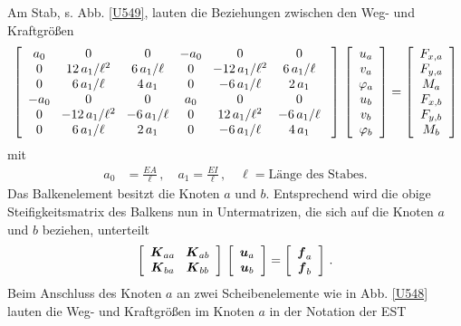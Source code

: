 Am Stab, s. Abb. \ref{U549}, lauten die Beziehungen zwischen den Weg- und Kraftgr\"{o}{\ss}en
\begin{align}
\left[\barr{c @{\hspace{3mm}} c @{\hspace{3mm}} c @{\hspace{3mm}} c @{\hspace{3mm}} c @{\hspace{3mm}} c @{\hspace{3mm}} c @{\hspace{3mm}} c} a_0 & 0 & 0 &- a_0 & 0 & 0 \\
0 & 12\,a_1/\ell^2 & 6\,a_1/\ell & 0 &-12\,a_1/\ell^2& 6\,a_1/\ell \\
0 &6\,a_1/\ell & 4\,a_1 & 0 &-6\,a_1/\ell & 2\,a_1 \\
-a_0 & 0 & 0 & a_0 & 0 & 0 \\
0 & -12\,a_1/\ell^2 & -6\,a_1/\ell & 0 &12\,a_1/\ell^2& -6\,a_1/\ell \\
0 &6\,a_1/\ell & 2\,a_1 & 0 &-6\,a_1/\ell & 4\,a_1
\earr \right]\,\left[\barr{c} u_a \\ v_a \\ \Np_a \\ u_b \\v_b \\ \Np_b \earr \right] =
\left[\barr{c} F_{x,a} \\ F_{y,a} \\ M_a \\ F_{x,b} \\ F_{y,b} \\ M_b\earr \right]
\end{align}
mit
\begin{align}
a_0 &= \frac{E A}{\ell}\,, \quad a_1 = \frac{E I}{\ell}\,,  \quad \ell = \text{L\"{a}nge des Stabes}.
\end{align}
Das Balkenelement besitzt die Knoten $a $ und $b $. Entsprechend wird die obige Steifigkeitsmatrix des Balkens nun in Untermatrizen, die sich auf die Knoten $a $ und $b $ beziehen, unterteilt
\begin{align} \label{Eq30}
\left[\barr{c @{\hspace{3mm}} c } \vek K_{aa} & \vek K_{ab} \\
\vek K_{ba} &\vek K_{bb}\earr \right]\,\left[\barr{c} \vek u_a \\ \vek u_b\earr \right] = \left[\barr{c} \vek f_a \\ \vek f_b\earr \right]\,.
\end{align}
Beim Anschluss des Knoten $a $ an zwei Scheibenelemente wie in Abb. \ref{U548} lauten die Weg- und Kraftgr\"{o}{\ss}en im Knoten $a$ in der Notation der EST
